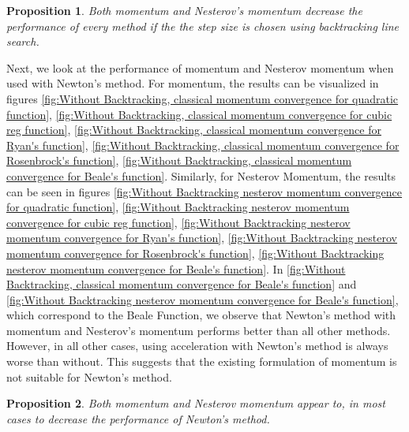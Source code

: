\documentclass{article}
\newtheorem{prop}{Proposition}
\begin{document}
\begin{prop}
	Both momentum and Nesterov's momentum decrease the performance of every method if the the step size is chosen using backtracking line search.
\end{prop}

Next, we look at the performance of momentum and Nesterov momentum when used with Newton's method. For momentum, the results can be visualized in figures \ref{fig:Without Backtracking, classical momentum convergence for quadratic function},
\ref{fig:Without Backtracking, classical momentum convergence for cubic reg function},
\ref{fig:Without Backtracking, classical momentum convergence for Ryan's function},
\ref{fig:Without Backtracking, classical momentum convergence for Rosenbrock's function},
\ref{fig:Without Backtracking, classical momentum convergence for Beale's function}. Similarly, for Nesterov Momentum, the results can be seen in figures \ref{fig:Without Backtracking nesterov momentum convergence for quadratic function},
\ref{fig:Without Backtracking nesterov momentum convergence for cubic reg function},
\ref{fig:Without Backtracking nesterov momentum convergence for Ryan's function},
\ref{fig:Without Backtracking nesterov momentum convergence for Rosenbrock's function},
\ref{fig:Without Backtracking nesterov momentum convergence for Beale's function}. In \ref{fig:Without Backtracking, classical momentum convergence for Beale's function} and \ref{fig:Without Backtracking nesterov momentum convergence for Beale's function}, which correspond to the Beale Function, we observe that Newton's method with momentum and Nesterov's momentum performs better than all other methods. However, in all other cases, using acceleration with Newton's method is always worse than without. This suggests that the existing formulation of momentum is not suitable for Newton's method.

\begin{prop}
	Both momentum and Nesterov momentum appear to, in most cases to decrease the performance of Newton's method. 
\end{prop}
\end{document}
